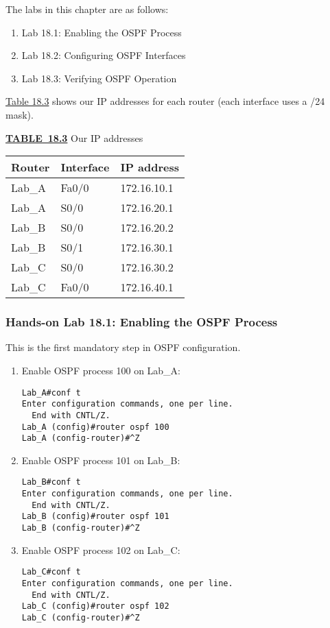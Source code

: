 The labs in this chapter are as follows:

\begin{enumerate}
\tightlist
\item
  Lab 18.1: Enabling the OSPF Process
\item
  Lab 18.2: Configuring OSPF Interfaces
\item
  Lab 18.3: Verifying OSPF Operation
\end{enumerate}

\protect\hyperlink{c18.xhtmlux5cux23table18-3}{Table 18.3} shows our IP
addresses for each router (each interface uses a /24 mask).

{\protect\hyperlink{c18.xhtmlux5cux23tableanchor18-3}{\textbf{TABLE~18.3}}
Our IP addresses}

\begin{longtable}[]{@{}lll@{}}
\toprule
Router & Interface & IP address\tabularnewline
\midrule
\endhead
Lab\_A & Fa0/0 & 172.16.10.1\tabularnewline
Lab\_A & S0/0 & 172.16.20.1\tabularnewline
Lab\_B & S0/0 & 172.16.20.2\tabularnewline
Lab\_B & S0/1 & 172.16.30.1\tabularnewline
Lab\_C & S0/0 & 172.16.30.2\tabularnewline
Lab\_C & Fa0/0 & 172.16.40.1\tabularnewline
\bottomrule
\end{longtable}

\subsubsection[Hands-on Lab 18.1: Enabling the OSPF
Process]{\texorpdfstring{\protect\hypertarget{c18.xhtmlux5cux23c18-sec-21}{}{}Hands-on
Lab 18.1: Enabling the OSPF
Process}{Hands-on Lab 18.1: Enabling the OSPF Process}}

This is the first mandatory step in OSPF configuration.

\begin{enumerate}
\item
  Enable OSPF process 100 on Lab\_A:

\begin{verbatim}
Lab_A#conf t
Enter configuration commands, one per line.
  End with CNTL/Z.
Lab_A (config)#router ospf 100
Lab_A (config-router)#^Z
\end{verbatim}
\item
  Enable OSPF process 101 on Lab\_B:

\begin{verbatim}
Lab_B#conf t
Enter configuration commands, one per line.
  End with CNTL/Z.
Lab_B (config)#router ospf 101
Lab_B (config-router)#^Z
\end{verbatim}
\item
  Enable OSPF process 102 on Lab\_C:

\begin{verbatim}
Lab_C#conf t
Enter configuration commands, one per line.
  End with CNTL/Z.
Lab_C (config)#router ospf 102
Lab_C (config-router)#^Z
\end{verbatim}
\end{enumerate}

